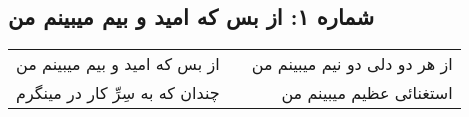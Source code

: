 \begin{center}
\section*{شماره ۱: از بس که امید و بیم میبینم من}
\label{sec:001}
\begin{longtable}{l p{0.5cm} r}
از بس که امید و بیم میبینم من
&&
از هر دو دلی دو نیم میبینم من
\\
چندان که به سِرِّ کار در مینگرم
&&
استغنائی عظیم میبینم من
\\
\end{longtable}
\end{center}
